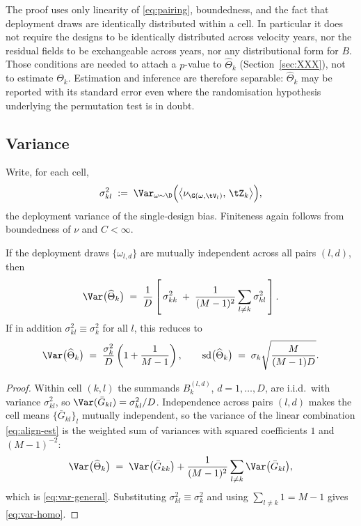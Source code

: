 \begin{remark}
\label{rem:noassumption}
The proof uses only linearity of \eqref{eq:pairing}, boundedness, and the fact that deployment
draws are identically distributed within a cell. In particular it does not require the designs to
be identically distributed across velocity years, nor the residual fields to be exchangeable across
years, nor any distributional form for $B$. Those conditions are needed to attach a $p$-value to
$\widehat{\Theta}_k$ (Section~\ref{sec:XXX}), not to estimate $\Theta_k$. Estimation and inference
are therefore separable: $\widehat{\Theta}_k$ may be reported with its standard error even where
the randomisation hypothesis underlying the permutation test is in doubt.
\end{remark}

\subsection{Variance}
\label{sec:align-var}

Write, for each cell,
\begin{equation}
  \sigma^2_{kl} \;:=\; \Var_{\omega\sim\D}\Big(\big\langle \nu_{\G(\omega,\tV_l)},\, \tZ_k\big\rangle\Big) ,
\end{equation}
the deployment variance of the single-design bias. Finiteness again follows from boundedness of
$\nu$ and $C < \infty$.

\begin{proposition}
\label{prop:var}
If the deployment draws $\{\omega_{l,d}\}$ are mutually independent across all pairs $(l,d)$, then
\begin{equation}
  \label{eq:var-general}
  \Var\big(\widehat{\Theta}_k\big)
  \;=\; \frac{1}{D}\left[\, \sigma^2_{kk} \;+\; \frac{1}{(M-1)^2}\sum_{l \neq k} \sigma^2_{kl} \,\right] .
\end{equation}
If in addition $\sigma^2_{kl} \equiv \sigma^2_k$ for all $l$, this reduces to
\begin{equation}
  \label{eq:var-homo}
  \Var\big(\widehat{\Theta}_k\big) \;=\; \frac{\sigma_k^{2}}{D}\left(1 + \frac{1}{M-1}\right),
  \qquad
  \mathrm{sd}\big(\widehat{\Theta}_k\big) \;=\; \sigma_k\sqrt{\frac{M}{(M-1)D}} .
\end{equation}
\end{proposition}

\begin{proof}
Within cell $(k,l)$ the summands $B_k^{(l,d)}$, $d = 1,\dots,D$, are i.i.d.\ with variance
$\sigma^2_{kl}$, so $\Var(\bar{G}_{kl}) = \sigma^2_{kl}/D$. Independence across pairs $(l,d)$
makes the cell means $\{\bar{G}_{kl}\}_{l}$ mutually independent, so the variance of the linear
combination \eqref{eq:align-est} is the weighted sum of variances with squared coefficients $1$ and
$(M-1)^{-2}$:
\begin{equation}
  \Var\big(\widehat{\Theta}_k\big)
  \;=\; \Var\big(\bar{G}_{kk}\big) + \frac{1}{(M-1)^2}\sum_{l\neq k}\Var\big(\bar{G}_{kl}\big) ,
\end{equation}
which is \eqref{eq:var-general}. Substituting $\sigma^2_{kl} \equiv \sigma^2_k$ and using
$\sum_{l\neq k} 1 = M-1$ gives \eqref{eq:var-homo}.
\end{proof}


